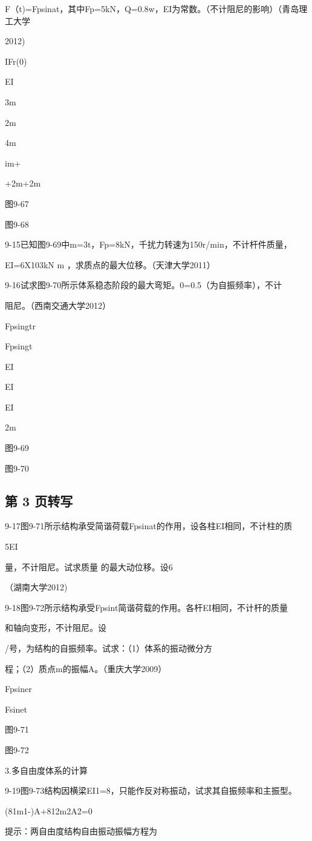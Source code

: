 F（t)=Fpsinat，其中Fp=5kN，Q=0.8w，EI为常数。（不计阻尼的影响）（青岛理工大学

2012)

IFr(0)

EI

3m

2m

4m

im+

+2m+2m

图9-67

图9-68

9-15已知图9-69中m=3t，Fp=8kN，千扰力转速为150r/min，不计杆件质量，

EI=6X103kN m ，求质点的最大位移。（天津大学2011）

9-16试求图9-70所示体系稳态阶段的最大弯矩。0=0.5（为自振频率），不计

阻尼。（西南交通大学2012）

Fpsingtr

Fpsingt

EI

EI

EI

2m

图9-69

图9-70

\subsection*{第 3 页转写}
9-17图9-71所示结构承受简谐荷载Fpsinat的作用，设各柱EI相同，不计柱的质

5EI

量，不计阻尼。试求质量 的最大动位移。设6

（湖南大学2012)

9-18图9-72所示结构承受Fpsint简谐荷载的作用。各杆EI相同，不计杆的质量

和轴向变形，不计阻尼。设

/号，为结构的自振频率。试求：（1）体系的振动微分方

程；（2）质点m的振幅A。（重庆大学2009）

Fpsiner

Fsinet

图9-71

图9-72

3.多自由度体系的计算

9-19图9-73结构因横梁EI1=8，只能作反对称振动，试求其自振频率和主振型。

(81m1-)A+812m2A2=0

提示：两自由度结构自由振动振幅方程为

